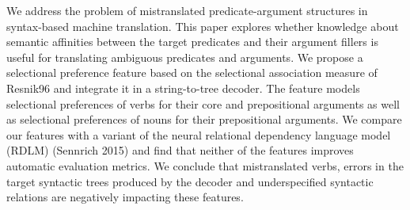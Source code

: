 We address the problem of mistranslated predicate-argument structures in syntax-based machine translation. This paper explores whether knowledge about semantic affinities between the target predicates and their argument fillers is useful for translating ambiguous predicates and arguments. We propose a selectional preference feature based on the selectional association measure of Resnik96 and integrate it in a string-to-tree decoder. The feature models selectional preferences of verbs for their core and prepositional arguments as well as selectional preferences of nouns for their prepositional arguments. We compare our features with a variant of the neural relational dependency language model (RDLM) (Sennrich 2015) and find that neither of the features improves automatic evaluation metrics. We conclude that mistranslated verbs, errors in the target syntactic trees produced by the decoder and underspecified syntactic relations are negatively impacting these features.
